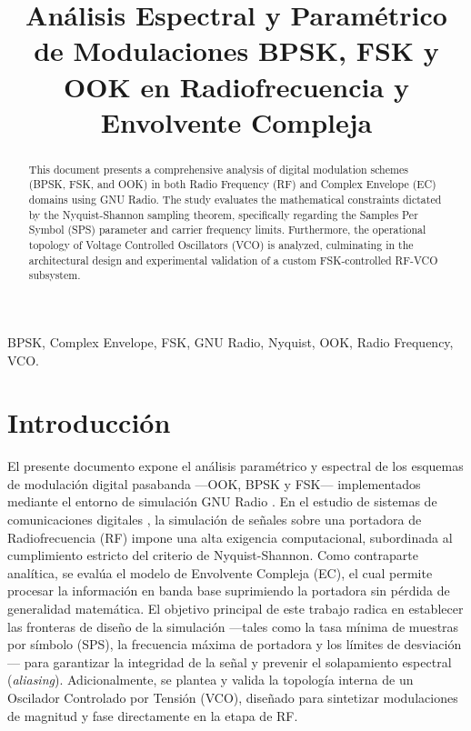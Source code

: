 \documentclass[conference, 10pt]{IEEEtran}
\begin{document}
\title{Análisis Espectral y Paramétrico de Modulaciones BPSK, FSK y OOK en Radiofrecuencia y Envolvente Compleja}

\author{
}

\maketitle

\begin{abstract}
This document presents a comprehensive analysis of digital modulation schemes (BPSK, FSK, and OOK) in both Radio Frequency (RF) and Complex Envelope (EC) domains using GNU Radio. The study evaluates the mathematical constraints dictated by the Nyquist-Shannon sampling theorem, specifically regarding the Samples Per Symbol (SPS) parameter and carrier frequency limits. Furthermore, the operational topology of Voltage Controlled Oscillators (VCO) is analyzed, culminating in the architectural design and experimental validation of a custom FSK-controlled RF-VCO subsystem.
\end{abstract}

\begin{IEEEkeywords}
BPSK, Complex Envelope, FSK, GNU Radio, Nyquist, OOK, Radio Frequency, VCO.
\end{IEEEkeywords}

\section{Introducción}
El presente documento expone el análisis paramétrico y espectral de los esquemas de modulación digital pasabanda —OOK, BPSK y FSK— implementados mediante el entorno de simulación GNU Radio \cite{guia4}. En el estudio de sistemas de comunicaciones digitales \cite{proakis}, la simulación de señales sobre una portadora de Radiofrecuencia (RF) impone una alta exigencia computacional, subordinada al cumplimiento estricto del criterio de Nyquist-Shannon. Como contraparte analítica, se evalúa el modelo de Envolvente Compleja (EC), el cual permite procesar la información en banda base suprimiendo la portadora sin pérdida de generalidad matemática. El objetivo principal de este trabajo radica en establecer las fronteras de diseño de la simulación —tales como la tasa mínima de muestras por símbolo (SPS), la frecuencia máxima de portadora y los límites de desviación— para garantizar la integridad de la señal y prevenir el solapamiento espectral (\textit{aliasing}). Adicionalmente, se plantea y valida la topología interna de un Oscilador Controlado por Tensión (VCO), diseñado para sintetizar modulaciones de magnitud y fase directamente en la etapa de RF\cite{ortega}.
\end{document}
